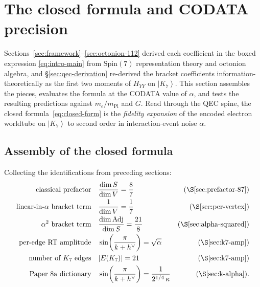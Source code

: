 \documentclass[11pt]{article}
\newcommand{\Spin}{\mathrm{Spin}}
\newcommand{\Adj}{\mathrm{Adj}}
\newcommand{\ket}[1]{\left|#1\right\rangle}
\newcommand{\mPl}{m_{\mathrm{Pl}}}
\newcommand{\hv}{h^{\vee}}
\begin{document}
\section{The closed formula and CODATA precision}
\label{sec:closed-formula}

Sections~\ref{sec:framework}--\ref{sec:octonion-112} derived each
coefficient in the boxed expression \eqref{eq:intro-main} from
$\Spin(7)$ representation theory and octonion algebra, and
\S\ref{sec:qec-derivation} re-derived the bracket coefficients
information-theoretically as the first two moments of $H_{YY}$
on $\ket{K_7}$.  This section assembles the pieces, evaluates the
formula at the CODATA value of $\alpha$, and tests the resulting
predictions against $m_e/\mPl$ and $G$.  Read through the QEC
spine, the closed formula~\eqref{eq:closed-form} is the
\emph{fidelity expansion} of the encoded electron worldtube on
$\ket{K_7}$ to second order in interaction-event noise $\alpha$.

\subsection{Assembly of the closed formula}
\label{sec:closed-assembly}

Collecting the identifications from preceding sections:
\begin{align}
  \text{classical prefactor} \quad & \frac{\dim S}{\dim V}
    = \frac{8}{7}                    & \text{(\S\ref{sec:prefactor-87})} \\
  \text{linear-in-$\alpha$ bracket term} \quad & \frac{1}{\dim V}
    = \frac{1}{7}                    & \text{(\S\ref{sec:per-vertex})} \\
  \text{$\alpha^2$ bracket term} \quad & \frac{\dim \Adj}{\dim S}
    = \frac{21}{8}                   & \text{(\S\ref{sec:alpha-squared})} \\
  \text{per-edge RT amplitude} \quad & \sin\!\left(\frac{\pi}{k + \hv}\right)
    = \sqrt{\alpha}                  & \text{(\S\ref{sec:k7-amp})} \\
  \text{number of $K_7$ edges} \quad & |E(K_7)| = 21
    & \text{(\S\ref{sec:k7-amp})} \\
  \text{Paper~8a dictionary} \quad & \sin\!\left(\frac{\pi}{k+\hv}\right)
    = \frac{1}{2^{1/4}\,\kappa}      & \text{(\S\ref{sec:k-alpha})}.
\end{align}
\end{document}
